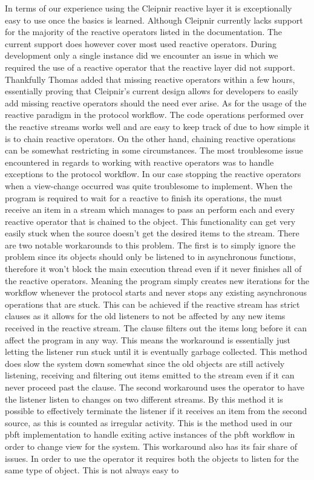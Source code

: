 In terms of our experience using the Cleipnir reactive layer it is exceptionally easy to use once the basics is learned. Although Cleipnir currently lacks support for the majority of the reactive operators listed in the documentation. The current support does however cover most used reactive operators. During development only a single instance did we encounter an issue in which we required the use of a reactive operator that the reactive layer did not support. Thankfully Thomas added that missing reactive operators within a few hours, essentially proving that Cleipnir's current design allows for developers to easily add missing reactive operators should the need ever arise. As for the usage of the reactive paradigm in the protocol workflow. The code operations performed over the reactive streams works well and are easy to keep track of due to how simple it is to chain reactive operators. On the other hand, chaining reactive operations can be somewhat restricting in some circumstances. The most troublesome issue encountered in regards to working with reactive operators was to handle exceptions to the protocol workflow. In our case stopping the reactive operators when a view-change occurred was quite troublesome to implement. When the program is required to wait for a reactive  to finish its operations, the  must receive an item in a stream which manages to pass an perform each and every reactive operator that is chained to the  object. This functionality can get very easily stuck when the source doesn't get the desired items to the stream. There are two notable workarounds to this problem. The first is to simply ignore the problem since its  objects should only be listened to in  asynchronous functions, therefore it won't block the main execution thread even if it never finishes all of the reactive operators. Meaning the program simply creates new iterations for the workflow whenever the protocol starts and never stops any existing asynchronous operations that are stuck. This can be achieved if the reactive stream has strict  clauses as it allows for the old listeners to not be affected by any new items received in the reactive stream. The  clause filters out the items long before it can affect the program in any way. This means the workaround is essentially just letting the listener run stuck until it is eventually garbage collected. This method does slow the system down somewhat since the old  objects are still actively listening, receiving and filtering out items emitted to the stream even if it can never proceed past the  clause. The second workaround uses the  operator to have the listener listen to changes on two different streams. By this method it is possible to effectively terminate the listener if it receives an item from the second source, as this is counted as irregular activity. This is the method used in our \ac{pbft} implementation to handle exiting active instances of the \ac{pbft} workflow in order to change view for the system. This workaround also has its fair share of issues. In order to use the  operator it requires both the  objects to listen for the same type of object. This is not always easy to 